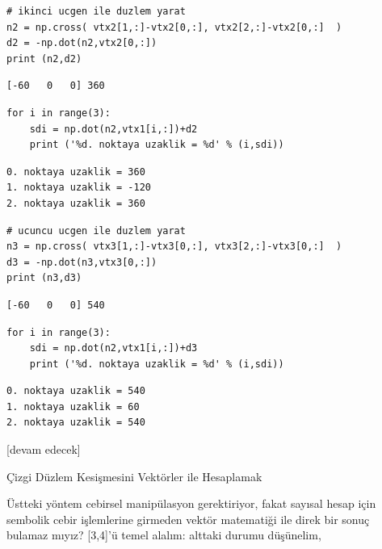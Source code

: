 \documentclass[12pt,fleqn]{article}\usepackage{../../common}
\begin{document}
\begin{verbatim}
# ikinci ucgen ile duzlem yarat
n2 = np.cross( vtx2[1,:]-vtx2[0,:], vtx2[2,:]-vtx2[0,:]  )
d2 = -np.dot(n2,vtx2[0,:])
print (n2,d2)
\end{verbatim}

\begin{verbatim}
[-60   0   0] 360
\end{verbatim}

\begin{verbatim}
for i in range(3):
    sdi = np.dot(n2,vtx1[i,:])+d2
    print ('%d. noktaya uzaklik = %d' % (i,sdi))
\end{verbatim}

\begin{verbatim}
0. noktaya uzaklik = 360
1. noktaya uzaklik = -120
2. noktaya uzaklik = 360
\end{verbatim}

\begin{verbatim}
# ucuncu ucgen ile duzlem yarat
n3 = np.cross( vtx3[1,:]-vtx3[0,:], vtx3[2,:]-vtx3[0,:]  )
d3 = -np.dot(n3,vtx3[0,:])
print (n3,d3)
\end{verbatim}

\begin{verbatim}
[-60   0   0] 540
\end{verbatim}

\begin{verbatim}
for i in range(3):
    sdi = np.dot(n2,vtx1[i,:])+d3
    print ('%d. noktaya uzaklik = %d' % (i,sdi))
\end{verbatim}

\begin{verbatim}
0. noktaya uzaklik = 540
1. noktaya uzaklik = 60
2. noktaya uzaklik = 540
\end{verbatim}













[devam edecek]

Çizgi Düzlem Kesişmesini Vektörler ile Hesaplamak

Üstteki yöntem cebirsel manipülasyon gerektiriyor, fakat sayısal hesap için
sembolik cebir işlemlerine girmeden vektör matematiği ile direk bir sonuç
bulamaz mıyız? [3,4]'ü temel alalım: alttaki durumu düşünelim, 
\end{document}
